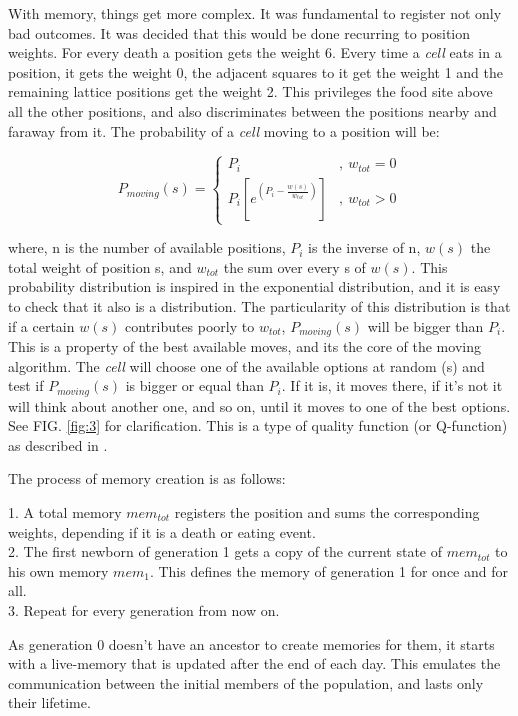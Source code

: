 \documentclass[a4paper,prd,twocolumn,nofootinbib,superscriptaddress,floatfix]{revtex4}
\begin{document}
With memory, things get more complex. It was fundamental to register not only bad outcomes. It was decided that this would be done recurring to position weights. For every death a position gets the weight 6. Every time a \textit{cell} eats in a position, it gets the weight 0, the adjacent squares to it get the weight 1 and the remaining lattice positions get the weight 2. This privileges the food site above all the other positions, and also discriminates between the positions nearby and faraway from it. The probability of a \textit{cell} moving to a position will be:

\[
  P_{moving}(s)=
  \begin{cases}
     P_i & , \ w_{tot}=0 \\
     P_i [ e^{(P_i-\frac{w(s)}{w_{tot}}) } ] & ,\ w_{tot}>0
  \end{cases}
\]

where, n is the number of available positions, $P_i$ is the inverse of n, $w(s)$ the total weight of position s, and $w_{tot}$ the sum over every s of $w(s)$.
   This probability distribution is inspired in the exponential distribution, and it is easy to check that it also is a distribution. The particularity of this distribution is that if a certain $w(s)$ contributes poorly to $w_{tot}$,  $P_{moving}(s)$ will be bigger than $P_i$. This is a property of the best available moves, and its the core of the moving algorithm. The \textit{cell} will choose one of the available options at random (s) and test if $P_{moving}(s)$ is bigger or equal than $P_i$. If it is, it moves there, if it's not it will think about another one, and so on, until it moves to one of the best options. See FIG. \ref{fig:3} for clarification. This is a type of quality function (or Q-function) as described in \cite{qfunction}.




The process of memory creation is as follows:

1.  A total memory  \textit{$mem_{tot}$} registers the position and sums the corresponding weights, depending if it is a death or eating event.\\
2. The first newborn of generation 1 gets a copy of the current state of \textit{$mem_{tot}$} to his own memory \textit{$mem_1$}. This defines the memory of generation 1 for once and for all.\\
3. Repeat for every generation from now on.


As generation 0 doesn't have an ancestor to create memories for them, it starts with a live-memory that is updated after the end of each day. This emulates the communication between the initial members of the population, and lasts only their lifetime.
\end{document}
